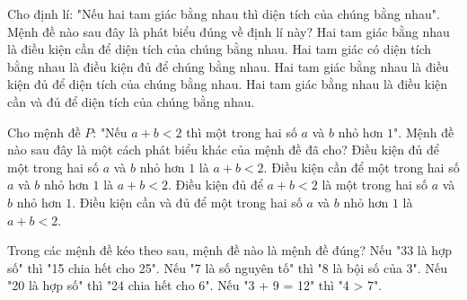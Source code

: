 \begin{ex}
	Cho định lí: "Nếu hai tam giác bằng nhau thì diện tích của chúng bằng nhau". Mệnh đề nào sau đây là phát biểu đúng về định lí này?
	\choice
	{Hai tam giác bằng nhau là điều kiện cần để diện tích của chúng bằng nhau.}
	{Hai tam giác có diện tích bằng nhau là điều kiện đủ để chúng bằng nhau.}
	{\True Hai tam giác bằng nhau là điều kiện đủ để diện tích của chúng bằng nhau.}
	{Hai tam giác bằng nhau là điều kiện cần và đủ để diện tích của chúng bằng nhau.}
\end{ex}

\begin{ex}
	Cho mệnh đề $P$: "Nếu $a+b < 2$ thì một trong hai số $a$ và $b$ nhỏ hơn $1$". Mệnh đề nào sau đây là một cách phát biểu khác của mệnh đề đã cho?
	\choice
	{\True Điều kiện đủ để một trong hai số $a$ và $b$ nhỏ hơn $1$ là $a+b < 2$.}
	{Điều kiện cần để một trong hai số $a$ và $b$ nhỏ hơn $1$ là $a+b < 2$.}
	{Điều kiện đủ để $a+b < 2$ là một trong hai số $a$ và $b$ nhỏ hơn $1$.}
	{Điều kiện cần và đủ để một trong hai số $a$ và $b$ nhỏ hơn $1$ là $a+b < 2$.}
\end{ex}

\begin{ex}
	Trong các mệnh đề kéo theo sau, mệnh đề nào là mệnh đề đúng?
	\choice
	{Nếu "33 là hợp số" thì "15 chia hết cho 25".}
	{Nếu "7 là số nguyên tố" thì "8 là bội số của 3".}
	{\True Nếu "20 là hợp số" thì "24 chia hết cho 6".}
	{Nếu "3 + 9 = 12" thì "4 > 7".}
\end{ex}

